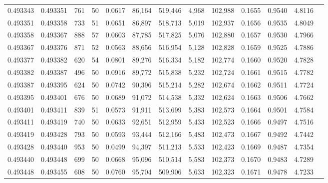 \begin{tabular}{rrrrrrrrrrrrr}
0.493343 & 0.493351 &   761 &  50 &                                     0.0617 &  86,164 & 519,446 &   4,968 & 102,988 & 0.1655 & 0.9540 & 4.8116 \\
0.493351 & 0.493358 &   733 &  51 &                                     0.0651 &  86,897 & 518,713 &   5,019 & 102,937 & 0.1656 & 0.9535 & 4.8049 \\
0.493358 & 0.493367 &   888 &  57 &                                     0.0603 &  87,785 & 517,825 &   5,076 & 102,880 & 0.1657 & 0.9530 & 4.7966 \\
0.493367 & 0.493376 &   871 &  52 &                                     0.0563 &  88,656 & 516,954 &   5,128 & 102,828 & 0.1659 & 0.9525 & 4.7886 \\
0.493377 & 0.493382 &   620 &  54 &                                     0.0801 &  89,276 & 516,334 &   5,182 & 102,774 & 0.1660 & 0.9520 & 4.7828 \\
0.493382 & 0.493387 &   496 &  50 &                                     0.0916 &  89,772 & 515,838 &   5,232 & 102,724 & 0.1661 & 0.9515 & 4.7782 \\
0.493387 & 0.493395 &   624 &  50 &                                     0.0742 &  90,396 & 515,214 &   5,282 & 102,674 & 0.1662 & 0.9511 & 4.7724 \\
0.493395 & 0.493401 &   676 &  50 &                                     0.0689 &  91,072 & 514,538 &   5,332 & 102,624 & 0.1663 & 0.9506 & 4.7662 \\
0.493401 & 0.493411 &   839 &  51 &                                     0.0573 &  91,911 & 513,699 &   5,383 & 102,573 & 0.1664 & 0.9501 & 4.7584 \\
0.493411 & 0.493419 &   740 &  50 &                                     0.0633 &  92,651 & 512,959 &   5,433 & 102,523 & 0.1666 & 0.9497 & 4.7516 \\
0.493419 & 0.493428 &   793 &  50 &                                     0.0593 &  93,444 & 512,166 &   5,483 & 102,473 & 0.1667 & 0.9492 & 4.7442 \\
0.493428 & 0.493440 &   953 &  50 &                                     0.0499 &  94,397 & 511,213 &   5,533 & 102,423 & 0.1669 & 0.9487 & 4.7354 \\
0.493440 & 0.493448 &   699 &  50 &                                     0.0668 &  95,096 & 510,514 &   5,583 & 102,373 & 0.1670 & 0.9483 & 4.7289 \\
0.493448 & 0.493455 &   608 &  50 &                                     0.0760 &  95,704 & 509,906 &   5,633 & 102,323 & 0.1671 & 0.9478 & 4.7233 \\

\end{tabular}
